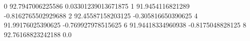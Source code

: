 0 92.7947006225586 0.03301239013671875
1 91.9454116821289 -0.8162765502929688
2 92.45587158203125 -0.305816650390625
4 91.99176025390625 -0.769927978515625
6 91.94418334960938 -0.8175048828125
8 92.76168823242188 0.0
